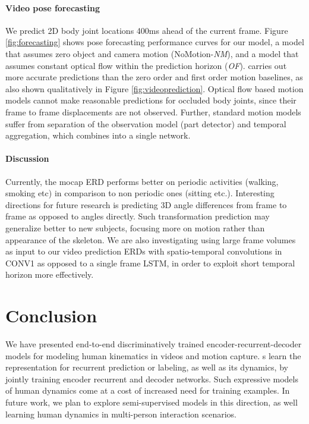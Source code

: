 \documentclass[10pt,twocolumn,letterpaper]{article}
\begin{document}
\paragraph{Video pose forecasting}
We predict 2D  body joint locations  400ms ahead of the current frame. 
Figure \ref{fig:forecasting} shows pose forecasting performance curves for our  model, a model that assumes zero object and camera motion  (NoMotion-\textit{NM}), and a model that assumes constant optical flow within the prediction horizon (\textit{OF}).  
 carries out more accurate predictions than the zero order and first order motion baselines, as also shown qualitatively in Figure \ref{fig:videoprediction}.  
Optical flow based motion models cannot make reasonable predictions for occluded body joints, since their frame to frame displacements are not observed.  
Further, standard motion models suffer from separation of the observation model (part detector) and temporal aggregation, which  combines into a single network.  



\paragraph{Discussion}
Currently, the mocap ERD performs  better on periodic activities (walking, smoking etc) in comparison to non periodic ones (sitting etc.).  Interesting directions for future research is predicting 3D angle differences from frame to frame as opposed to angles directly. Such transformation prediction may generalize better to new subjects, focusing more on  motion rather than  appearance of the skeleton. We are also investigating using large frame volumes as input to our video prediction ERDs with spatio-temporal convolutions in CONV1 as opposed to a single frame LSTM, in order to exploit short temporal horizon more effectively. 


     \section{Conclusion}
We have presented end-to-end  discriminatively trained encoder-recurrent-decoder models for modeling human kinematics in videos and motion capture. s   learn the representation for recurrent prediction or labeling, as well as its dynamics, by jointly training encoder recurrent and decoder networks. 
Such expressive models of human dynamics come at a cost of increased need for training examples. In future work, we plan to explore semi-supervised models in this direction, as well learning human dynamics   in multi-person interaction scenarios.   
\end{document}
